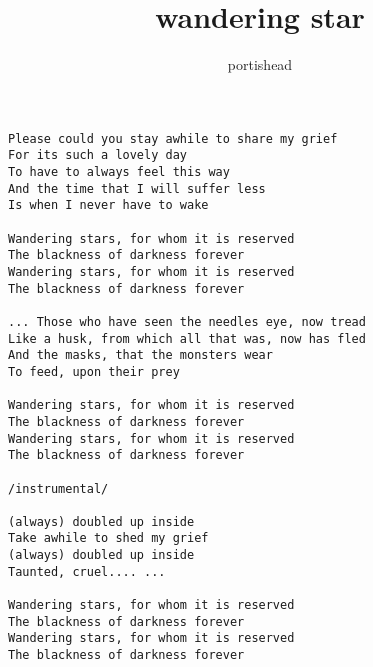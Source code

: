 \author{portishead}
\title{wandering star}
\maketitle
\begin{verbatim}
Please could you stay awhile to share my grief
For its such a lovely day
To have to always feel this way
And the time that I will suffer less
Is when I never have to wake

Wandering stars, for whom it is reserved
The blackness of darkness forever
Wandering stars, for whom it is reserved
The blackness of darkness forever

... Those who have seen the needles eye, now tread
Like a husk, from which all that was, now has fled
And the masks, that the monsters wear
To feed, upon their prey

Wandering stars, for whom it is reserved
The blackness of darkness forever
Wandering stars, for whom it is reserved
The blackness of darkness forever

/instrumental/

(always) doubled up inside
Take awhile to shed my grief
(always) doubled up inside
Taunted, cruel.... ...

Wandering stars, for whom it is reserved
The blackness of darkness forever
Wandering stars, for whom it is reserved
The blackness of darkness forever
\end{verbatim}